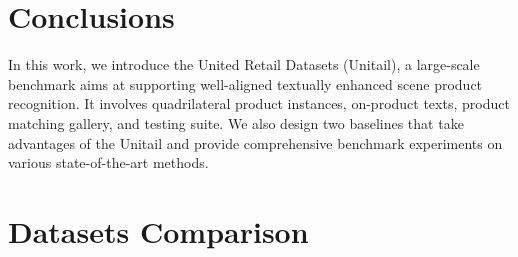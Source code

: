 \documentclass[runningheads]{llncs}
\begin{document}
\section{Conclusions}
In this work, we introduce the United Retail Datasets (Unitail), a large-scale benchmark aims at supporting well-aligned textually enhanced scene product recognition. It involves quadrilateral product instances, on-product texts, product matching gallery, and testing suite. We also design two baselines that take advantages of the Unitail and provide comprehensive benchmark experiments on various state-of-the-art methods.

%
%



\clearpage

\appendix

\section{Datasets Comparison}
\end{document}
